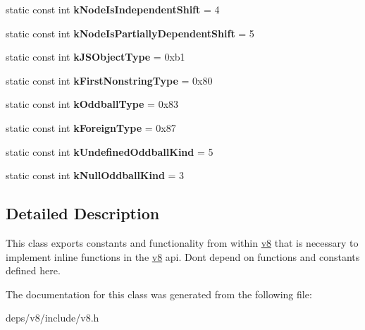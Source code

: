 \begin{DoxyCompactItemize}
\item 
\hypertarget{classv8_1_1internal_1_1_internals_a228b2b58c77c17bc512b92d9e3aea48b}{}static const int {\bfseries k\+Node\+Is\+Independent\+Shift} = 4\label{classv8_1_1internal_1_1_internals_a228b2b58c77c17bc512b92d9e3aea48b}

\item 
\hypertarget{classv8_1_1internal_1_1_internals_aeda4d6fc1bd10ca57398597f3bb496f3}{}static const int {\bfseries k\+Node\+Is\+Partially\+Dependent\+Shift} = 5\label{classv8_1_1internal_1_1_internals_aeda4d6fc1bd10ca57398597f3bb496f3}

\item 
\hypertarget{classv8_1_1internal_1_1_internals_a56b7062df5d9a7df491137d4c3341bcc}{}static const int {\bfseries k\+J\+S\+Object\+Type} = 0xb1\label{classv8_1_1internal_1_1_internals_a56b7062df5d9a7df491137d4c3341bcc}

\item 
\hypertarget{classv8_1_1internal_1_1_internals_a6f4a54927b01a11f444fb2f00b47ca1d}{}static const int {\bfseries k\+First\+Nonstring\+Type} = 0x80\label{classv8_1_1internal_1_1_internals_a6f4a54927b01a11f444fb2f00b47ca1d}

\item 
\hypertarget{classv8_1_1internal_1_1_internals_a13081e936f8c96472f1b1496c70d4dc1}{}static const int {\bfseries k\+Oddball\+Type} = 0x83\label{classv8_1_1internal_1_1_internals_a13081e936f8c96472f1b1496c70d4dc1}

\item 
\hypertarget{classv8_1_1internal_1_1_internals_a263195f36f9e8ee64af70dc267a85d55}{}static const int {\bfseries k\+Foreign\+Type} = 0x87\label{classv8_1_1internal_1_1_internals_a263195f36f9e8ee64af70dc267a85d55}

\item 
\hypertarget{classv8_1_1internal_1_1_internals_a39072b9e0ffea4031f4a1c514208b20d}{}static const int {\bfseries k\+Undefined\+Oddball\+Kind} = 5\label{classv8_1_1internal_1_1_internals_a39072b9e0ffea4031f4a1c514208b20d}

\item 
\hypertarget{classv8_1_1internal_1_1_internals_a72243c5512cb5cab9d10b6f29e775180}{}static const int {\bfseries k\+Null\+Oddball\+Kind} = 3\label{classv8_1_1internal_1_1_internals_a72243c5512cb5cab9d10b6f29e775180}

\end{DoxyCompactItemize}


\subsection{Detailed Description}
This class exports constants and functionality from within \hyperlink{namespacev8}{v8} that is necessary to implement inline functions in the \hyperlink{namespacev8}{v8} api. Don\textquotesingle{}t depend on functions and constants defined here. 

The documentation for this class was generated from the following file\+:\begin{DoxyCompactItemize}
\item 
deps/v8/include/v8.\+h\end{DoxyCompactItemize}
